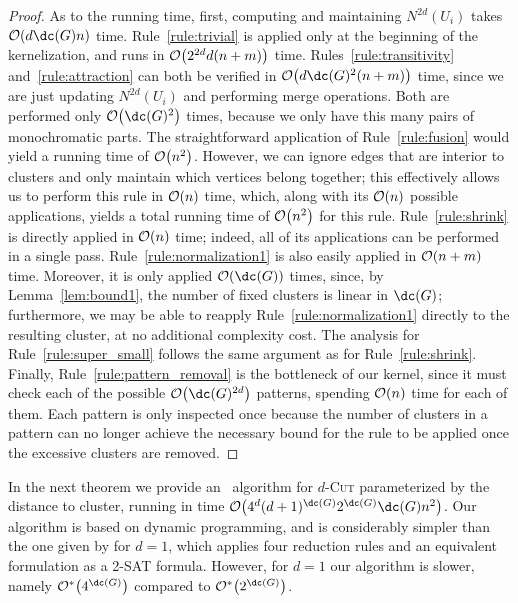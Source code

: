\begin{proof}
    As to the running time, first, computing and maintaining $N^{2d}(U_i)$ takes $\bigO{d\dc(G)n}$ time.
    Rule~\ref{rule:trivial} is applied only at the beginning of the kernelization, and runs in $\mathcal{O}\!\left(2^{2d}d(n + m)\right)$ time.
    Rules~\ref{rule:transitivity} and~\ref{rule:attraction} can both be verified in $\bigO{d\dc(G)^2(n + m)}$ time, since we are just updating $N^{2d}(U_i)$ and performing merge operations.
    Both are performed only $\bigO{\dc(G)^2}$ times, because we only have this many pairs of monochromatic parts.
    The straightforward application of Rule~\ref{rule:fusion} would yield a running time of $\mathcal{O}\!\left(n^2\right)$. However, we can ignore edges that are interior to clusters and only maintain which vertices belong together; this effectively allows us to perform this rule in $\mathcal{O}\!\left(n\right)$ time, which, along with its $\mathcal{O}\!\left(n\right)$ possible applications, yields a total running time of $\mathcal{O}\!\left(n^2\right)$ for this rule.
    Rule~\ref{rule:shrink} is directly applied in $\mathcal{O}\!\left(n\right)$ time; indeed, all of its applications can be performed in a single pass.
    Rule~\ref{rule:normalization1} is also easily applied in $\mathcal{O}\!\left(n + m\right)$ time. Moreover, it is only applied $\bigO{\dc(G)}$ times, since, by Lemma~\ref{lem:bound1}, the number of fixed clusters is linear in $\dc(G)$; furthermore, we may be able to reapply Rule~\ref{rule:normalization1} directly to the resulting cluster, at no additional complexity cost.
    The analysis for Rule~\ref{rule:super_small} follows the same argument as for Rule~\ref{rule:shrink}.
    Finally, Rule~\ref{rule:pattern_removal} is the bottleneck of our kernel, since it must check each of the possible $\bigO{\dc(G)^{2d}}$ patterns, spending $\mathcal{O}\!\left(n\right)$ time for each of them.
    Each pattern is only inspected once because the number of clusters in a pattern can no longer achieve the necessary bound for the rule to be applied once the excessive clusters are removed.
\end{proof}

In the next theorem we provide an \FPT\ algorithm for \textsc{$d$-Cut} parameterized by the distance to cluster, running in time $\bigO{4^d(d+1)^{\dc(G)}2^{\dc(G)}\dc(G)n^2}$. Our algorithm is based on dynamic programming, and is considerably simpler than the one given by \cite{matching_cut_ipec} for $d=1$, which applies four reduction rules and an equivalent formulation as a 2-\textsc{SAT} formula. However, for $d=1$ our algorithm is slower, namely $\bigOs{4^{\dc( G )}}$ compared to  $\bigOs{2^{\dc( G )}}$.



